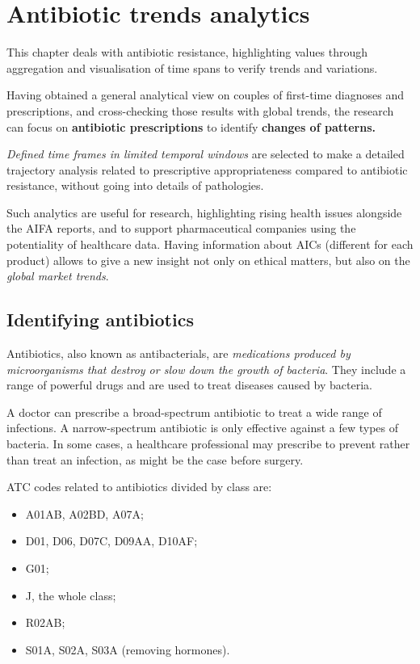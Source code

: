 \chapter{Antibiotic trends analytics}
This chapter deals with antibiotic resistance, highlighting values through aggregation and visualisation of time spans to verify trends and variations. 

Having obtained a general analytical view on couples of first-time diagnoses and prescriptions, and cross-checking those results with global trends, the research can focus on \textbf{antibiotic prescriptions} to identify \textbf{changes of patterns.}

\textit{Defined time frames in limited temporal windows} are selected to make a detailed trajectory analysis related to prescriptive appropriateness compared to antibiotic resistance, without going into details of pathologies.

Such analytics are useful for research, highlighting rising health issues alongside the AIFA reports, and to support pharmaceutical companies using the potentiality of healthcare data. Having information about AICs (different for each product) allows to give a new insight not only on ethical matters, but also on the \textit{global market trends}.

\section{Identifying antibiotics}
Antibiotics, also known as antibacterials, are \textit{medications produced by microorganisms that destroy or slow down the growth of bacteria}\cite{antibiotic}. They include a range of powerful drugs and are used to treat diseases caused by bacteria. 

A doctor can prescribe a broad-spectrum antibiotic to treat a wide range of infections. A narrow-spectrum antibiotic is only effective against a few types of bacteria. In some cases, a healthcare professional may prescribe to prevent rather than treat an infection, as might be the case before surgery. 
 
 ATC codes related to antibiotics divided by class are:
 \begin{itemize}
 	\item A01AB, A02BD, A07A;
 	\item D01, D06, D07C, D09AA, D10AF;
 	\item G01;
 	\item J, the whole class;
 	\item R02AB;
 	\item S01A, S02A, S03A (removing hormones).
 \end{itemize}

